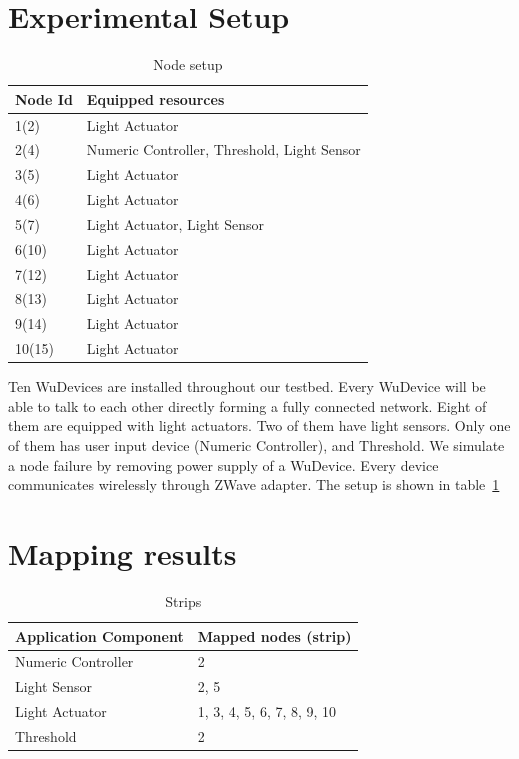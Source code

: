 \section{Experimental Setup}

\begin{table}
\centering
\caption{Node setup}
\label{tbl:setup}
  \begin{tabular}{|l|l|}
  \hline
  \textbf{Node Id} & \textbf{Equipped resources} \\
  \hline
  1(2) & Light Actuator \\
  \hline
  2(4) & Numeric Controller, Threshold, Light Sensor \\
  \hline
  3(5) & Light Actuator \\
  \hline
  4(6) & Light Actuator \\
  \hline
  5(7) & Light Actuator, Light Sensor \\
  \hline
  6(10) & Light Actuator \\
  \hline
  7(12) & Light Actuator \\
  \hline
  8(13) & Light Actuator \\
  \hline
  9(14) & Light Actuator \\
  \hline
  10(15) & Light Actuator \\
  \hline
  \end{tabular}
\end{table}

Ten WuDevices are installed throughout our testbed. Every WuDevice will be
able to talk to each other directly forming a fully connected network. Eight of them are
equipped with light actuators. Two of them have light sensors. Only one of them
has user input device (Numeric Controller), and Threshold. We simulate a node
failure by removing power supply of a WuDevice. Every device communicates
wirelessly through ZWave adapter. The setup is shown in table~\ref{tbl:setup}

\section{Mapping results}

\begin{table}
\centering
\caption{Strips}
\label{tbl:mapping-result}
  \begin{tabular}{|l|l|}
  \hline
  \textbf{Application Component} & \textbf{Mapped nodes (strip)} \\
  \hline
  Numeric Controller & 2 \\
  \hline
  Light Sensor & 2, 5 \\
  \hline
  Light Actuator & 1, 3, 4, 5, 6, 7, 8, 9, 10 \\
  \hline
  Threshold & 2 \\
  \hline
  \end{tabular}
\end{table}

